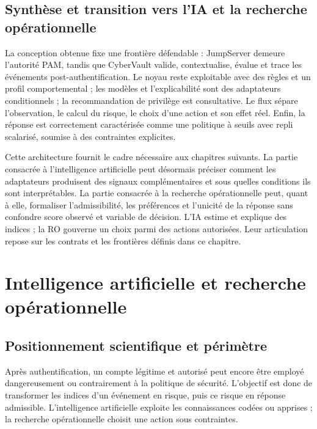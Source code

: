 \documentclass[11pt,a4paper,oneside]{report}
\theoremstyle{definition}
\theoremstyle{plain}
\begin{document}
\section{Synthèse et transition vers l'IA et la recherche opérationnelle}

La conception obtenue fixe une frontière défendable : JumpServer demeure
l'autorité PAM, tandis que CyberVault valide, contextualise, évalue et trace
les événements post-authentification. Le noyau reste exploitable avec des
règles et un profil comportemental ; les modèles et l'explicabilité sont des
adaptateurs conditionnels ; la recommandation de privilège est consultative.
Le flux sépare l'observation, le calcul du risque, le choix d'une action et son
effet réel. Enfin, la réponse est correctement caractérisée comme une politique
à seuils avec repli scalarisé, soumise à des contraintes explicites.

Cette architecture fournit le cadre nécessaire aux chapitres suivants. La
partie consacrée à l'intelligence artificielle peut désormais préciser comment
les adaptateurs produisent des signaux complémentaires et sous quelles
conditions ils sont interprétables. La partie consacrée à la recherche
opérationnelle peut, quant à elle, formaliser l'admissibilité, les préférences
et l'unicité de la réponse sans confondre score observé et variable de
décision. L'IA estime et explique des indices ; la RO gouverne un choix parmi
des actions autorisées. Leur articulation repose sur les contrats et les
frontières définis dans ce chapitre.

\chapter{Intelligence artificielle et recherche opérationnelle}
\label{chap:ai-ro}

\section{Positionnement scientifique et périmètre}

Après authentification, un compte légitime et autorisé peut encore être employé dangereusement ou contrairement à la politique de sécurité. L'objectif est donc de transformer les indices d'un événement en risque, puis ce risque en réponse admissible. L'intelligence artificielle exploite les connaissances codées ou apprises ; la recherche opérationnelle choisit une action sous contraintes.
\end{document}
